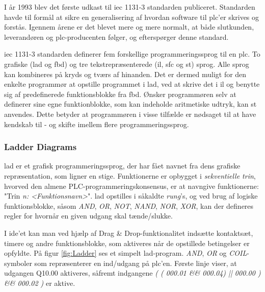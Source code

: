 \noindent I år 1993 blev det første udkast til \gls{iec} 1131-3 standarden publiceret\cite{iecStandard}. Standarden havde til formål at sikre en generalisering af hvordan software til \gls{plc}'er skrives og forstås. Igennem årene er det blevet mere og mere normalt, at både slutkunden, leverandøren og \gls{plc}-producenten følger, og efterspørger denne standard. 

\gls{iec} 1131-3 standarden definerer fem forskellige programmeringssprog til en \gls{plc}. To grafiske (\gls{lad} og \gls{fbd}) og tre tekstrepræsenterede (\gls{il}, \gls{sfc} og \gls{st}) sprog. Alle sprog kan kombineres på kryds og tværs af hinanden. Det er dermed muligt for den enkelte programmør at opstille programmet i \gls{lad}, ved at skrive det i \gls{il} og benytte sig af predefinerede funktionsblokke fra \gls{fbd}. Ønsker programmøren selv at definerer sine egne funktionblokke, som kan indeholde aritmetiske udtryk, kan \gls{st} anvendes. Dette betyder at programmøren i visse tilfælde er nødsaget til at have kendskab til - og skifte imellem flere programmeringssprog. 

\subsubsection{Ladder Diagrams}
\gls{lad} er et grafisk programmeringssprog, der har fået navnet fra dens grafiske repræsentation, som ligner en stige. Funktionerne er opbygget i \textit{sekventielle trin}, hvorved den almene PLC-programmeringskonsensus, er at navngive funktionerne: "Trin \textit{n: <Funktionsnavn>}". 
\gls{lad} opstilles i såkaldte \textit{rung}'s, og ved brug af logiske funktionsblokke, såsom \textit{AND}, \textit{OR}, \textit{NOT}, \textit{NAND}, \textit{NOR}, \textit{XOR}, kan der defineres regler for hvornår en given udgang skal tænde/slukke. 

I \gls{ide}'et kan man ved hjælp af Drag \& Drop-funktionalitet indsætte kontaktsæt, timere og andre funktionsblokke, som aktiveres når de opstillede betingelser er opfyldte. På figur \ref{fig:Ladder} ses et simpelt \gls{lad}-program. \textit{AND}, \textit{OR} og \textit{COIL}-symboler som repræsenterer en ind/udgang på \gls{plc}'en. Første linje viser, at udgangen Q10.00 aktiveres, såfremt indgangene \textit{( ( 000.01 \&\& 000.04) || 000.00 ) \&\& 000.02 )} er aktive.


